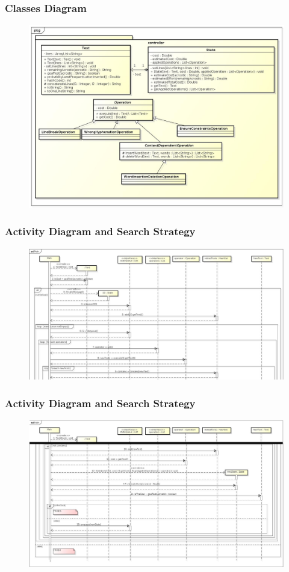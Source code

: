 \documentclass{beamer}
\begin{document}
\begin{frame}
\frametitle{Classes Diagram}
\begin{figure}
\includegraphics[scale=0.2]{Controller}
\end{figure}
\end{frame}

\begin{frame}
\frametitle{Activity Diagram and Search Strategy}
\begin{figure}
\includegraphics[scale=0.16]{Main_1}
\end{figure}
\end{frame}

\begin{frame}
\frametitle{Activity Diagram and Search Strategy}
\begin{figure}
\includegraphics[scale=0.16]{Main_2}
\end{figure}
\end{frame}
\end{document}
